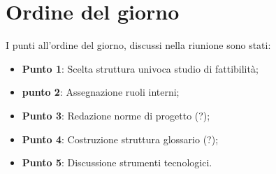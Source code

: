 \section{Ordine del giorno}
I punti all'ordine del giorno, discussi nella riunione sono stati:
\begin{itemize}

	\item \textbf{Punto 1}: Scelta struttura univoca studio di fattibilità;
	\item \textbf{punto 2}: Assegnazione ruoli interni; 
	\item \textbf{Punto 3}: Redazione norme di progetto (?);
	\item \textbf{Punto 4}: Costruzione struttura glossario (?); 
	\item \textbf{Punto 5}: Discussione strumenti tecnologici.

\end{itemize}
